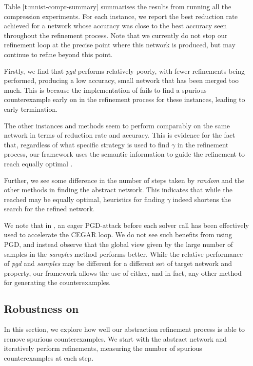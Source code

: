 Table \ref{t:mnist-compr-summary} summarises the results from running all the
\mnist compression experiments. For each instance, we report the best reduction
rate achieved for a network whose accuracy was close to the best accuracy seen
throughout the refinement process. Note that we currently do not stop our
refinement loop at the precise point where this network is produced, but may
continue to refine beyond this point.

Firstly, we find that \textit{pgd} performs relatively poorly, with fewer
refinements being performed, producing a low accuracy, small network that has
been merged too much. This is because the \abcrown
implementation of \pgd fails to find a spurious counterexample early on in the
refinement process for these instances, leading to early termination. 

The other instances and methods seem to perform
comparably on the same network in terms of reduction rate and accuracy. This is
evidence for the fact that, regardless of what specific strategy is used to
find $\gamma$ in the refinement process, our framework uses the
semantic information to guide the refinement to reach equally optimal \abs.

Further, we see some difference in the number of steps taken by \textit{random}
and the other methods in finding the abstract network. This indicates that while
the \abs reached may be equally optimal, 
heuristics for finding $\gamma$ indeed
shortens the search for the refined network.

We note that in \cite{cleverest-nn}, an eager PGD-attack before each solver call
has been effectively used to accelerate the CEGAR loop. We do not see such
benefits from using PGD, and instead observe that the global view given by
the large number of samples in the \textit{samples} method performs better.
While the relative performance of \textit{pgd} and \textit{samples} may be
different for a different set of target network and property, our framework
allows the use of either, and in-fact, any other method for generating the
counterexamples.

\subsection{Robustness on \mnist}
\label{s:exp-mnist-rob}

In this section, we explore how well our abstraction refinement process is able
to remove spurious counterexamples. We start with the abstract network and
iteratively perform refinements, measuring the number of spurious
counterexamples at each step. 


